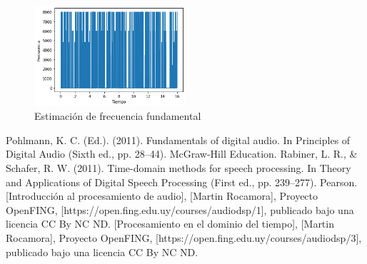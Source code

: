 \documentclass[a4paper]{article}
\begin{document}
\begin{figure}[h]
\centering
\includegraphics[width=0.5\textwidth]{mal.png}
\caption{Estimación de frecuencia fundamental}
\label{fundpeor}
\end{figure}

\newpage
\begin{thebibliography}{100} %
\addtolength{\leftmargin}{0.2in} %
\setlength{\itemindent}{-0.2in}
Pohlmann, K. C. (Ed.). (2011). Fundamentals of digital audio. In Principles of Digital Audio (Sixth ed., pp. 28–44). McGraw-Hill Education.
 Rabiner, L. R., & Schafer, R. W. (2011). Time-domain methods for speech processing. In Theory and Applications of Digital Speech Processing (First ed., pp. 239–277). Pearson.
 [Introducción al procesamiento de audio], [Martin Rocamora], Proyecto OpenFING, [https://open.fing.edu.uy/courses/audiodsp/1], publicado bajo una licencia CC By NC ND.
[Procesamiento en el dominio del tiempo], [Martin Rocamora], Proyecto OpenFING, [https://open.fing.edu.uy/courses/audiodsp/3], publicado bajo una licencia CC By NC ND.
\end{thebibliography}
\end{document}
